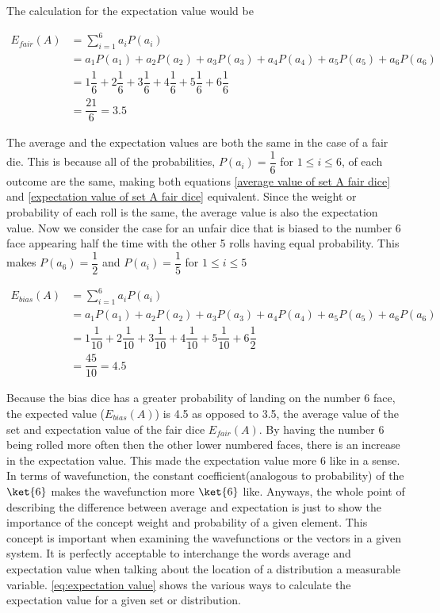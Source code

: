 \documentclass[11pt,a4paper]{book}
\begin{document}
		The calculation for the expectation value would be
		
		\begin{equation}
		\label{expectation value of set A fair dice}
		\begin{split}
		E_{fair}(A) &= \sum_{i=1}^6{a_i P(a_i)}\\
		& =  a_1 P(a_1) + a_2 P(a_2) + a_3 P(a_3) + a_4 P(a_4) + a_5 P(a_5) + a_6 P(a_6) \\
		& =  1\dfrac{1}{6} + 2\dfrac{1}{6}+ 3\dfrac{1}{6} + 4\dfrac{1}{6} + 5\dfrac{1}{6} + 6\dfrac{1}{6}\\
		& = \dfrac{21}{6} = 3.5
		\end{split}
		\end{equation}
		
		The average and the expectation values are both the same in the case of a fair die. This is because all of the probabilities, $P(a_i)=\dfrac{1}{6}$ for $1\leq i \leq 6$, of each outcome are the same, making both equations \autoref{average value of set A fair dice} and \autoref{expectation value of set A fair dice} equivalent. Since the weight or probability of each roll is the same, the average value is also the expectation value. Now we consider the case for an unfair dice that is biased to the number 6 face appearing half the time with the other 5 rolls having equal probability. This makes $P(a_6)=\dfrac{1}{2}$ and $P(a_i)=\dfrac{1}{5}$ for $1 \leq i \leq 5$
		
		\begin{equation}
			\label{expectation value of set A unfair dice}
			\begin{split}
				E_{bias}(A) &= \sum_{i=1}^6{a_i P(a_i)}\\
				& =  a_1 P(a_1) + a_2 P(a_2) + a_3 P(a_3) + a_4 P(a_4) + a_5 P(a_5) + a_6 P(a_6) \\
				& =  1\dfrac{1}{10} + 2\dfrac{1}{10}+ 3\dfrac{1}{10} + 4\dfrac{1}{10} + 5\dfrac{1}{10} + 6\dfrac{1}{2}\\
				& = \dfrac{45}{10} = 4.5
			\end{split}
		\end{equation}
		
		Because the bias dice has a greater probability of landing on the number 6 face, the expected value ($E_{bias}(A)$) is 4.5 as opposed to 3.5, the average value of the set and expectation value of the fair dice $E_{fair}(A)$. By having the number 6 being rolled more often then the other lower numbered faces, there is an increase in the expectation value. This made the expectation value more 6 like in a sense. In terms of wavefunction, the constant coefficient(analogous to probability) of the $\ket{6}$ makes the wavefunction more $\ket{6}$ like. Anyways, the whole point of describing the difference between average and expectation is just to show the importance of the concept weight and probability of a given element. This concept is important when examining the wavefunctions or the vectors in a given system. It is perfectly acceptable to interchange the words average and expectation value when talking about the location of a distribution a measurable variable. \autoref{eq:expectation value} shows the various ways to calculate the expectation value for a given set or distribution.
			
\end{document}
